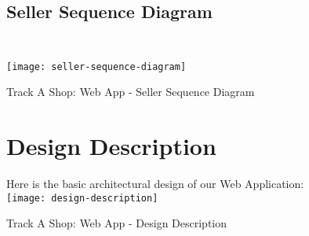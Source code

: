 \pagebreak
\begin{figure}[h]
	\subsection{Seller Sequence Diagram \\\\}
	\centering
	\texttt{[image: seller-sequence-diagram]}
	\caption{Track A Shop: Web App - Seller Sequence Diagram \citep{creately2019}}
\end{figure}


\pagebreak

\begin{figure}[h]
	\section{Design Description}
	Here is the basic architectural design of our Web Application:\\
	\vspace{1.5cm}
	\centering
	\texttt{[image: design-description]}
	\caption{Track A Shop: Web App - Design Description \citep{creately2019}}
\end{figure}
\pagebreak


